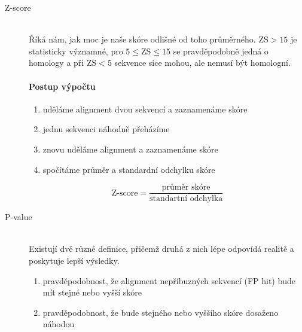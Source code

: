 \documentclass[DIV=8]{scrreprt}
\begin{document}
\begin{description}
\item[Z-score]\hfill \\
Říká nám, jak moc je naše skóre odlišné od toho průměrného. \(\text{ZS} > 15\) je statisticky významné, pro \(5 \leq \text{ZS} \leq 15\) se pravděpodobně jedná o homology a při \(\text{ZS} < 5\) sekvence sice mohou, ale nemusí být homologní.

\paragraph{Postup výpočtu}
\begin{enumerate}[nosep]
    \item uděláme alignment dvou sekvencí a zaznamenáme skóre
    \item jednu sekvenci náhodně přeházíme
    \item znovu uděláme alignment a zaznamenáme skóre
    \item spočítáme průměr a standardní odchylku skóre
\end{enumerate}



\[\text{Z-score} = \frac{\text{průměr skóre}}{\text{standartní odchylka}}\]


\item[P-value]\hfill \\
Existují dvě různé definice, přičemž druhá z nich lépe odpovídá realitě a poskytuje lepší výsledky.
\begin{enumerate}[nosep]
    \item pravděpodobnost, že alignment nepříbuzných sekvencí (FP hit) bude mít stejné nebo vyšší skóre
    \item pravděpodobnost, že bude stejného nebo vyššího skóre dosaženo náhodou
\end{enumerate}




\end{description}
\end{document}
